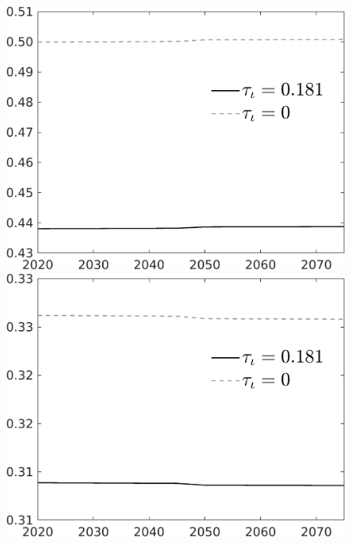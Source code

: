 \begin{figure}[h!!]
\begin{minipage}[]{0.32\textwidth}
\end{minipage}	
\begin{minipage}[]{0.32\textwidth}
\includegraphics[width=1\textwidth]{../../codding_model/own_basedOnFried/optimalPol_010922_revision/figures/all_13Sept22/CompTaul_Reg0_hh_spillover0_nsk0_xgr0_sep1_LFlimit1_emsbase0_countec0_GovRev1_etaa0.79_lgd1.png}
\end{minipage}	
\begin{minipage}[]{0.32\textwidth}
\includegraphics[width=1\textwidth]{../../codding_model/own_basedOnFried/optimalPol_010922_revision/figures/all_13Sept22/CompTaul_Reg0_hl_spillover0_nsk0_xgr0_sep1_LFlimit1_emsbase0_countec0_GovRev1_etaa0.79_lgd1.png}
\end{minipage}
\end{figure}
